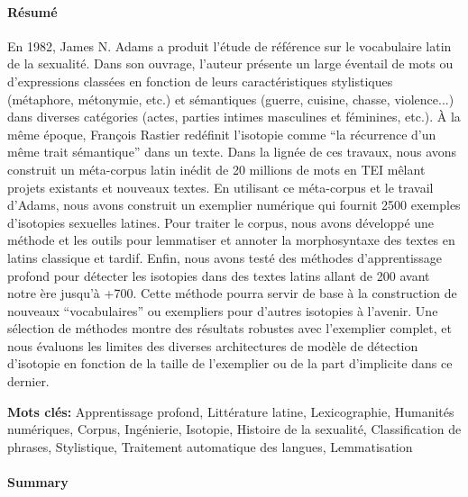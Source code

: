 \paragraph{Résumé}

En 1982, James N. Adams a produit l'étude de référence sur le vocabulaire latin de la sexualité. Dans son ouvrage, l'auteur présente un large éventail de mots ou d'expressions classées en fonction de leurs caractéristiques stylistiques (métaphore, métonymie, etc.) et sémantiques (guerre, cuisine, chasse, violence...) dans diverses catégories (actes, parties intimes masculines et féminines, etc.). À la même époque, François Rastier redéfinit l'isotopie comme \enquote{la récurrence d'un même trait sémantique} dans un texte. Dans la lignée de ces travaux, nous avons construit un méta-corpus latin inédit de 20 millions de mots en TEI mêlant projets existants et nouveaux textes. En utilisant ce méta-corpus et le travail d'Adams, nous avons construit un exemplier numérique qui fournit 2500 exemples d'isotopies sexuelles latines. Pour traiter le corpus, nous avons développé une méthode et les outils pour lemmatiser et annoter la morphosyntaxe des textes en latins classique et tardif. Enfin, nous avons testé des méthodes d'apprentissage profond pour détecter les isotopies dans des textes latins allant de 200 avant notre ère jusqu'à +700. Cette méthode pourra servir de base à la construction de nouveaux \enquote{vocabulaires} ou exempliers pour d'autres isotopies à l'avenir. Une sélection de méthodes montre des résultats robustes avec l'exemplier complet, et nous évaluons les limites des diverses architectures de modèle de détection d'isotopie en fonction de la taille de l'exemplier ou de la part d'implicite dans ce dernier.

\noindent\textbf{Mots clés:} Apprentissage profond, Littérature latine, Lexicographie, Humanités numériques, Corpus, Ingénierie, Isotopie, Histoire de la sexualité, Classification de phrases, Stylistique, Traitement automatique des langues, Lemmatisation

\paragraph{Summary}


